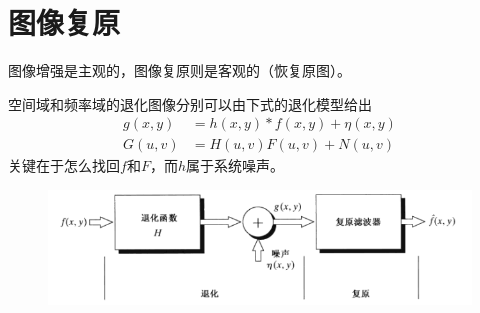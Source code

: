 
\section{图像复原}
图像增强是主观的，图像复原则是客观的（恢复原图）。

空间域和频率域的退化图像分别可以由下式的退化模型给出
\[\begin{aligned}
g(x,y)&=h(x,y)*f(x,y)+\eta(x,y)\\
G(u,v)&=H(u,v)F(u,v)+N(u,v)
\end{aligned}\]
关键在于怎么找回$f$和$F$，而$h$属于系统噪声。

\begin{figure}[H]
\centering
\includegraphics[width=0.8\linewidth]{fig/restoration.png}
\end{figure}


